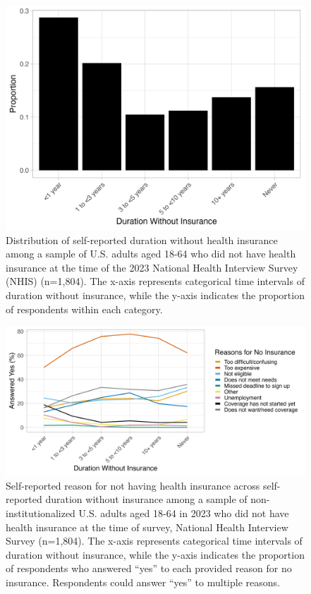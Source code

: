 \documentclass[12pt]{article}
\begin{document}
\begin{figure}[H]
  \centering
  \includegraphics[width=15cm]{figures/duration_no_insurance.png}
  \caption{Distribution of self-reported duration without health insurance among a sample of U.S. adults aged 18-64 who did not have health insurance at the time of the 2023 National Health Interview Survey (NHIS) (n=1,804). The x-axis represents categorical time intervals of duration without insurance, while the y-axis indicates the proportion of respondents within each category.}
\end{figure}

\begin{figure}[H]
  \centering
  \includegraphics[width=15cm]{figures/duration_no_insurance_by_reason.png}
  \caption{Self-reported reason for not having health insurance across self-reported duration without insurance among a sample of non-institutionalized U.S. adults aged 18-64 in 2023 who did not have health insurance at the time of survey, National Health Interview Survey (n=1,804). The x-axis represents categorical time intervals of duration without insurance, while the y-axis indicates the proportion of respondents who answered “yes” to each provided reason for no insurance. Respondents could answer “yes” to multiple reasons.}
\end{figure}
\end{document}

